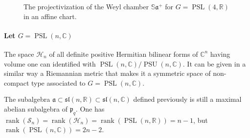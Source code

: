 \documentclass[reqno,10pt]{amsart}
\theoremstyle{plain}
\theoremstyle{definition}
\theoremstyle{remark}
\newcommand{\type}{\tau}
\newcommand{\R}{\mathbb{R}}
\newcommand{\C}{\mathbb{C}}
\newcommand{\Sph}{\mathbb{S}}
\DeclareMathOperator{\PSL}{PSL}
\DeclareMathOperator{\PSU}{PSU}
\DeclareMathOperator{\rank}{rank}
\begin{document}
\begin{figure}[h]
\begin{center}
%
%	
%
%
%
%
\end{center}

\caption{The projectivization of the Weyl chamber $\Sph\mathfrak{a}^+$ for $G=\PSL(4,\R)$ in an affine chart.}
\label{fig:WeylSL4}
\end{figure}

\paragraph*{Let $G=\PSL(n,\C)$}The space $\mathcal{H}_n$ of all definite positive Hermitian bilinear forms of $\C^n$ having volume one can identified with $\PSL(n,\mathbb{C})/\PSU(n,\mathbb{C})$. It can be given in a similar way a Riemannian metric that makes it a symmetric space of non-compact type associated to $G=\PSL(n,\mathbb{C})$.


The subalgebra $\mathfrak{a}\subset \mathfrak{sl}(n,\R)\subset \mathfrak{sl}(n,\C)$ defined previously is still a maximal abelian subalgebra of $\mathfrak{p}_q$. One has $\rank(\mathcal{S}_n)=\rank(\mathcal{H}_n)=\rank(\PSL(n,\R))=n-1$, but $\rank(\PSL(n,\C))=2n-2$.
\smallskip
\end{document}
